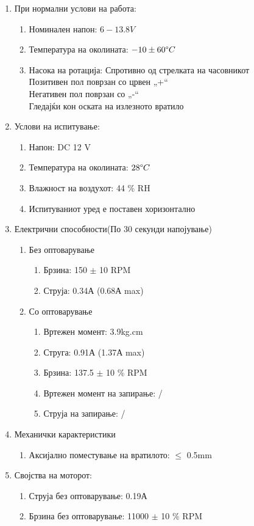 \documentclass{article}
\begin{document}
\renewcommand{\theenumii}{\arabic{enumii}}
\renewcommand{\theenumiii}{\arabic{enumiii}}
\begin{enumerate}
	\item При нормални услови на работа:
	\begin{enumerate}
		\item Номинален напон: $ 6-13.8 V $
		\item Температура на околината: $ -10 \pm 60 \degree C $
		\item Насока на ротација: Спротивно од стрелката на часовникот\\Позитивен пол поврзан со црвен „+“\\Негативен пол поврзан со „-“\\Гледајќи кон оската на излезното вратило
	\end{enumerate}
	\item Услови на испитување:
	\begin{enumerate}
		\item Напон: DC 12 V
		\item Температура на околината: $ 28 \degree C $
		\item Влажност на воздухот: 44 \% RH
		\item Испитуваниот уред е поставен хоризонтално
	\end{enumerate}
	\item Електрични способности(По 30 секунди напојување)
	\begin{enumerate}
		\item Без оптоварување
		\begin{enumerate}
			\item Брзина: 150 $\pm$ 10 RPM
			\item Струја: 0.34А (0.68А max)
		\end{enumerate}
		\item Со оптоварување
		\begin{enumerate}
			\item Вртежен момент: 3.9kg.cm
			\item Струга: 0.91А (1.37А max)
			\item Брзина: 137.5 $\pm$ 10 \% RPM
			\item Вртежен момент на запирање: /
			\item Струја на запирање: /
		\end{enumerate}
	\end{enumerate}
	\item Механички карактеристики
	\begin{enumerate}
		\item Аксијално поместување на вратилото: $\leq$ 0.5mm
	\end{enumerate}
	\item Својства на моторот:
	\begin{enumerate}
		\item Струја без оптоварување: 0.19А
		\item Брзина без оптоварување: 11000 $\pm$ 10 \% RPM
	\end{enumerate}
\end{enumerate}
\end{document}
